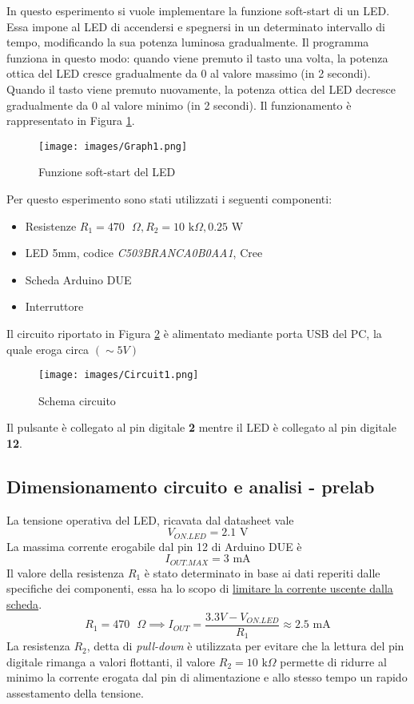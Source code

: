 In questo esperimento si vuole implementare la funzione soft-start di un LED. Essa impone al LED di accendersi e spegnersi in un determinato intervallo di tempo, modificando la sua potenza luminosa gradualmente. Il programma funziona in questo modo: quando viene premuto il tasto una volta, la potenza ottica del LED cresce gradualmente da 0 al valore massimo (in 2 secondi). Quando il tasto viene premuto nuovamente, la potenza ottica del LED decresce gradualmente da 0 al valore minimo (in 2 secondi). Il funzionamento è rappresentato in Figura \ref{fig:Graph1}.
\begin{figure}[H]
    \centering
    \texttt{[image: images/Graph1.png]}
    \caption{Funzione soft-start del LED}
    \label{fig:Graph1}
\end{figure}
Per questo esperimento sono stati utilizzati  i seguenti componenti:
\begin{itemize}
    \item Resistenze $R_1=470\text{ }\Omega,R_2=10\text{ k}\Omega, 0.25\text{ W}$
    \item LED 5mm, codice \textit{C503BRANCA0B0AA1}, Cree
    \item Scheda Arduino DUE
    \item Interruttore
\end{itemize}
Il circuito riportato in Figura \ref{fig:Circuit1} è alimentato mediante porta USB del PC, la quale eroga circa $(\sim 5 V)$
\begin{figure}[H]
    \centering
    \texttt{[image: images/Circuit1.png]}
    \caption{Schema circuito}
    \label{fig:Circuit1}
\end{figure}
Il pulsante è collegato al pin digitale \textbf{2} mentre il LED è collegato al pin digitale \textbf{12}.
\subsection{Dimensionamento circuito e analisi - prelab}
La tensione operativa del LED, ricavata dal datasheet vale 
\begin{equation*}
    V_{ON.LED}=2.1\text{ V}
\end{equation*}
La massima corrente erogabile dal pin 12 di Arduino DUE è 
\begin{equation*}
    I_{OUT.MAX}=3\text{ mA}
\end{equation*}
Il valore della resistenza $R_1$ è stato determinato in base ai dati reperiti dalle specifiche dei componenti, essa ha lo scopo di \underline{limitare la corrente uscente dalla scheda}.
\begin{equation}
    R_1=470\text{ }\Omega\implies I_{OUT}=\frac{3.3V-V_{ON.LED}}{R_1}\approx2.5\text{ mA}
\end{equation}
La resistenza $R_2$, detta di \textit{pull-down} è utilizzata per evitare che la lettura del pin digitale rimanga a valori flottanti, il valore $R_2 =  10\text{ k}\Omega$ permette di ridurre al minimo la corrente erogata dal pin di alimentazione e allo stesso tempo un rapido assestamento della tensione.
